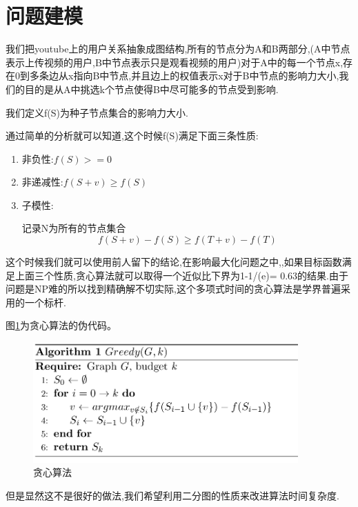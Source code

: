 \documentclass[11pt, a4paper]{article}
\begin{document}
  \section{问题建模}

  我们把youtube上的用户关系抽象成图结构,所有的节点分为A和B两部分,(A中节点表示上传视频的用户,B中节点表示只是观看视频的用户)对于A中的每一个节点x,存在0到多条边从x指向B中节点,并且边上的权值表示x对于B中节点的影响力大小,我们的目的是从A中挑选k个节点使得B中尽可能多的节点受到影响.

  我们定义f(S)为种子节点集合的影响力大小.

  通过简单的分析就可以知道,这个时候f(S)满足下面三条性质:

  \begin{enumerate}
  \item 非负性:$f(S)>=0$
  \item 非递减性:$f(S+v)\ge f(S)$
  \item 子模性:

  记录N为所有的节点集合
  \begin{equation}
    f(S+v)-f(S) \ge f(T+v) - f(T)
  \end{equation}

  \end{enumerate}

  这个时候我们就可以使用前人留下的结论,在影响最大化问题之中,,如果目标函数满足上面三个性质,贪心算法就可以取得一个近似比下界为1-1/(e)= 0.63的结果.由于问题是NP难的所以找到精确解不切实际,这个多项式时间的贪心算法是学界普遍采用的一个标杆.

  图\ref{fig:greedy}为贪心算法的伪代码。

  \begin{figure}[H]
    \centering\includegraphics[width=4in]{images/greedy.png}
    \caption{贪心算法}\label{fig:greedy}
  \end{figure}

  但是显然这不是很好的做法,我们希望利用二分图的性质来改进算法时间复杂度.
\end{document}
